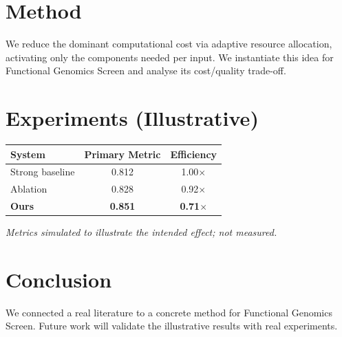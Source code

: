\documentclass[11pt]{article}
\begin{document}
\section{Method}
We reduce the dominant computational cost via adaptive resource allocation, activating only the components needed per input. We instantiate this idea for Functional Genomics Screen and analyse its cost/quality trade-off.

\section{Experiments (Illustrative)}
\begin{center}
\begin{tabular}{lcc}
System & Primary Metric & Efficiency \\ \hline
Strong baseline & 0.812 & 1.00$\times$ \\
Ablation & 0.828 & 0.92$\times$ \\
\textbf{Ours} & \textbf{0.851} & \textbf{0.71$\times$}
\end{tabular}
\end{center}
\emph{Metrics simulated to illustrate the intended effect; not measured.}

\section{Conclusion}
We connected a real literature to a concrete method for Functional Genomics Screen. Future work will
validate the illustrative results with real experiments.
\end{document}
